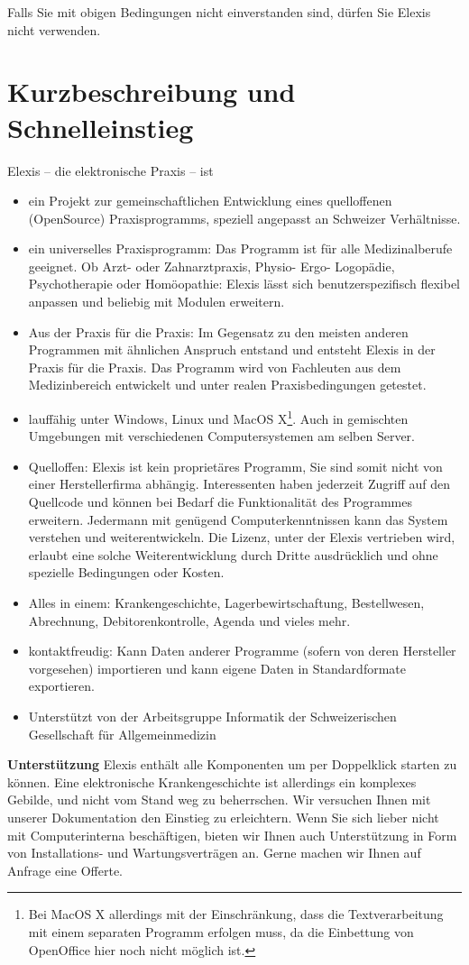 \documentclass[a4paper,BCOR8.25mm,twoside]{scrbook}
\begin{document}
Falls Sie mit obigen Bedingungen nicht einverstanden sind, dürfen Sie Elexis nicht verwenden.

\chapter{Kurzbeschreibung und Schnelleinstieg}
Elexis -- die elektronische Praxis -- ist
\begin{itemize}
	\item ein Projekt zur gemeinschaftlichen Entwicklung eines quelloffenen (OpenSource) Praxisprogramms,
speziell angepasst an Schweizer Verhältnisse.
	\item  ein universelles Praxisprogramm:  Das Programm ist für alle Medizinalberufe geeignet. Ob Arzt- oder
Zahnarztpraxis, Physio- Ergo- Logopädie, Psychotherapie oder Homöopathie: Elexis lässt sich benutzerspezifisch
flexibel anpassen und beliebig mit Modulen erweitern.
	\item Aus der Praxis für die Praxis: Im Gegensatz zu den meisten anderen Programmen mit ähnlichen Anspruch entstand und entsteht Elexis in der Praxis für die Praxis. Das Programm wird von Fachleuten aus dem Medizinbereich entwickelt und unter realen Praxisbedingungen getestet.

	\item lauffähig unter Windows, Linux und MacOS X\footnote{Bei MacOS X
	allerdings mit der Einschränkung, dass die Textverarbeitung mit einem separaten
	Programm erfolgen muss, da die Einbettung von OpenOffice hier noch nicht
	möglich ist.}. Auch
	in gemischten Umgebungen mit verschiedenen Computersystemen am selben Server.
	\item Quelloffen: Elexis ist kein proprietäres Programm, Sie sind somit nicht
	von einer Herstellerfirma abhängig. Interessenten haben jederzeit Zugriff auf
	den Quellcode und können bei Bedarf die Funktionalität des Programmes erweitern.
Jedermann mit genügend Computerkenntnissen kann das System verstehen und weiterentwickeln.
Die Lizenz, unter der Elexis vertrieben wird, erlaubt eine solche Weiterentwicklung durch Dritte ausdrücklich
und ohne spezielle Bedingungen oder Kosten.

	\item Alles in einem: Krankengeschichte, Lagerbewirtschaftung,
	Bestellwesen, Abrechnung, Debitorenkontrolle, Agenda und vieles mehr.
  	\item kontaktfreudig: Kann Daten anderer Programme (sofern von deren
 	Hersteller vorgesehen) importieren und kann eigene Daten in Standardformate
 	exportieren.
 	\item Unterstützt von der Arbeitsgruppe Informatik der Schweizerischen
Gesellschaft für Allgemeinmedizin %
\end{itemize}
\pagebreak[3]
\textbf{Unterstützung}
Elexis enthält alle Komponenten um per Doppelklick starten zu können.
Eine elektronische Krankengeschichte ist allerdings ein komplexes Gebilde, und nicht vom Stand weg zu
beherrschen. Wir versuchen Ihnen mit unserer Dokumentation den Einstieg zu
erleichtern. Wenn Sie sich lieber nicht mit Computerinterna beschäftigen, bieten
wir Ihnen auch Unterstützung in Form von Installations- und Wartungsverträgen
an. Gerne machen wir Ihnen auf Anfrage eine Offerte.
\end{document}
